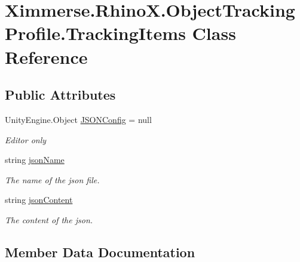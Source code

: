 \hypertarget{class_ximmerse_1_1_rhino_x_1_1_object_tracking_profile_1_1_tracking_items}{}\section{Ximmerse.\+Rhino\+X.\+Object\+Tracking\+Profile.\+Tracking\+Items Class Reference}
\label{class_ximmerse_1_1_rhino_x_1_1_object_tracking_profile_1_1_tracking_items}
\subsection*{Public Attributes}
\begin{DoxyCompactItemize}
\item 
Unity\+Engine.\+Object \mbox{\hyperlink{class_ximmerse_1_1_rhino_x_1_1_object_tracking_profile_1_1_tracking_items_aa0498b3e669a6a3089ae471647722664}{J\+S\+O\+N\+Config}} = null
\begin{DoxyCompactList}\small\item\em Editor only \end{DoxyCompactList}\item 
string \mbox{\hyperlink{class_ximmerse_1_1_rhino_x_1_1_object_tracking_profile_1_1_tracking_items_a4d4ed02f8829fbf3579876871920b1f7}{json\+Name}}
\begin{DoxyCompactList}\small\item\em The name of the json file. \end{DoxyCompactList}\item 
string \mbox{\hyperlink{class_ximmerse_1_1_rhino_x_1_1_object_tracking_profile_1_1_tracking_items_add856ff58e40c9650d63fed29e07e6e0}{json\+Content}}
\begin{DoxyCompactList}\small\item\em The content of the json. \end{DoxyCompactList}\end{DoxyCompactItemize}


\subsection{Member Data Documentation}
\mbox{\label{class_ximmerse_1_1_rhino_x_1_1_object_tracking_profile_1_1_tracking_items_aa0498b3e669a6a3089ae471647722664}} 
